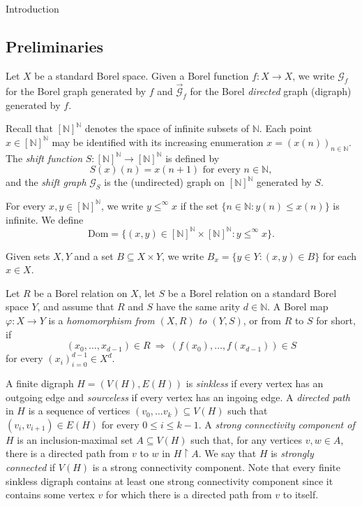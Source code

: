 \documentclass[psamsfonts]{amsart}
\theoremstyle{definition}
\newcommand{\N}{\mathbb N}
\newcommand{\Dom}{\text{Dom}}
\theoremstyle{remark}
\numberwithin{equation}{section}
\newcommand{\rest}{\restriction}
\newcommand\mcal{\mathcal}
\begin{document}
\begin{section}{Introduction}
\section{Preliminaries}
\label{sec:Prelim}

\newcommand{\dig}{\overrightarrow{\mathcal{G}}_f}
\newcommand{\digS}{\overrightarrow{\mathcal{G}}_S}

Let $X$ be a standard Borel space.
Given a Borel function $f:X\to X$, we write $\mcal{G}_f$ for the Borel graph generated by $f$ and $\dig$ for the Borel \emph{directed} graph (digraph) generated by $f$.

Recall that $[\N]^{\N}$ denotes the space of infinite subsets of $\N$. Each point $x \in [\N]^{\N}$ may be identified with its increasing enumeration $x = (x(n))_{n \in \N}$.
The \emph{shift function} $S:[\N]^\N\to [\N]^\N$ is defined by
$$S(x)(n)=x(n+1) \text{ for every } n\in \N,$$
and the \emph{shift graph} $\mcal{G}_S$ is the (undirected) graph on $[\N]^{\N}$ generated by $S$.

For every $x,y\in [\N]^\N$, we write $y\le^\infty x$ if the set $\{n\in \N:y(n)\le x(n)\}$ is infinite. We define
$$\Dom=\{(x,y)\in [\N]^\N\times [\N]^\N:y\le^\infty x\}.$$


\medskip

Given sets $X, Y$ and a set $B\subseteq X\times Y$, we write $B_x=\{y\in Y:(x,y)\in B\}$ for each $x \in X$.

Let $R$ be a Borel relation on $X$, let $S$ be a Borel relation on a standard Borel space $Y$, and assume that $R$ and $S$ have the same arity $d \in \N$.
A Borel map $\varphi:X\to Y$ is a \emph{homomorphism from $(X,R)$ to $(Y,S)$}, or from $R$ to $S$ for short, if 
$$(x_0,\dots,x_{d-1})\in R \ \Rightarrow \ (f(x_0),\dots,f(x_{d-1}))\in S$$
for every $(x_i)_{i=0}^{d-1}\in X^d$.


\medskip

A finite digraph $H=(V(H),E(H))$ is \emph{sinkless} if every vertex has an outgoing edge and \emph{sourceless} if every vertex has an ingoing edge.
A \emph{directed path} in $H$ is a sequence of vertices $(v_0,\dots v_k)\subseteq V(H)$ such that $(v_i,v_{i+1})\in E(H)$ for every $0\le i\le k-1$.
A \emph{strong connectivity component of $H$} is an inclusion-maximal set $A\subseteq V(H)$ such that, for any vertices $v, w \in A$, there is a directed path from $v$ to $w$ in $H \rest A$.
We say that $H$ is \emph{strongly connected} if $V(H)$ is a strong connectivity component. 
Note that every finite sinkless digraph contains at least one strong connectivity component since it contains some vertex $v$ for which there is a directed path from $v$ to itself.


\end{section}
\end{document}
